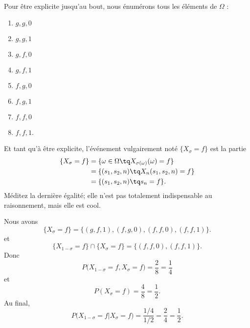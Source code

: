Pour être explicite jusqu'au bout, nous énumérons tous les éléments de \( \Omega\) :
\begin{multicols}{4}
    \begin{enumerate}
        \item
            \( g,g,0\)
        \item
            \( g,g,1\)
        \item
            \( g,f,0\)
        \item
            \( g,f,1\)
        \item
            \( f,g,0\)
        \item
            \( f,g,1\)
        \item
            \( f,f,0\)
        \item
            \( f,f,1\).
    \end{enumerate}
\end{multicols}

Et tant qu'à être explicite, l'événement vulgairement noté \( \{ X_{\sigma}=f \}\) est la partie
\begin{subequations}
    \begin{align}
    \{ X_{\sigma}=f \}&=\{ \omega\in \Omega\tq X_{\sigma(\omega)}(\omega)=f \}\\
    &=\{ (s_1,s_2,n)\tq X_n(s_1,s_2,n)=f \}\\
    &=\{ (s_1,s_2,n)\tq s_n=f \}.
    \end{align}
\end{subequations}
Méditez la dernière égalité; elle n'est pas totalement indispensable au raisonnement, mais elle est cool.


Nous avons
\begin{equation}
    \{ X_{\sigma}=f \}=\{ (g,f,1),(f,g,0),(f,f,0),(f,f,1) \}.
\end{equation}
et
\begin{equation}
    \{ X_{1-\sigma}=f \}\cap\{ X_{\sigma}=f \}=\{ (f,f,0),(f,f,1) \}.
\end{equation}
Donc
\begin{equation}
    P\big( X_{1-\sigma}=f,X_{\sigma}=f \big)=\frac{ 2 }{ 8 }=\frac{1}{ 4 }
\end{equation}
et
\begin{equation}
    P(X_{\sigma}=f)=\frac{ 4 }{ 8 }=\frac{ 1 }{2}.
\end{equation}
Au final,
\begin{equation}
    P\big( X_{1-\sigma}=f|X_{\sigma}=f \big)=\frac{ 1/4 }{ 1/2 }=\frac{ 2 }{ 4 }=\frac{ 1 }{2}.
\end{equation}


